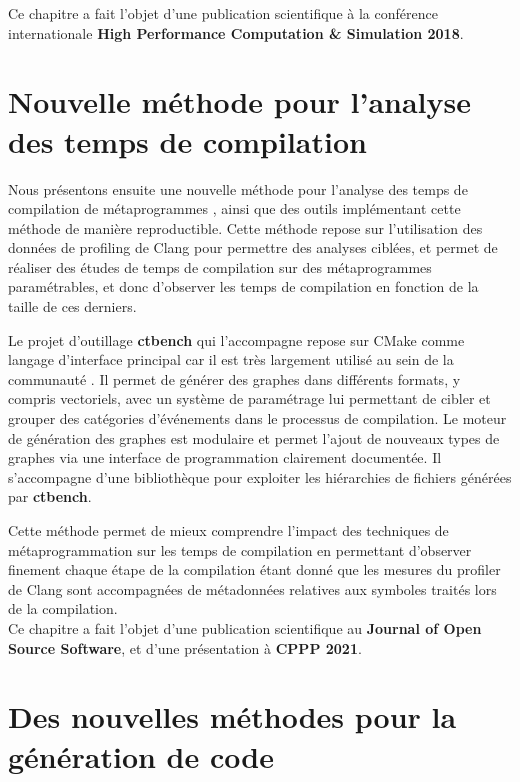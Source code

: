 \documentclass[main]{subfiles}
\begin{document}
Ce chapitre a fait l'objet d'une publication scientifique \`a la conf\'erence
internationale \textbf{High Performance Computation \& Simulation 2018}.

\section{
  Nouvelle m\'ethode pour l'analyse des temps de compilation
}

Nous pr\'esentons ensuite une nouvelle m\'ethode pour l'analyse des temps
de compilation de m\'etaprogrammes \cpp, ainsi que des outils impl\'ementant
cette m\'ethode de mani\`ere reproductible. Cette m\'ethode
repose sur l'utilisation des donn\'ees de profiling de Clang pour permettre
des analyses cibl\'ees, et permet de r\'ealiser des \'etudes de temps
de compilation sur des m\'etaprogrammes param\'etrables, et donc d'observer
les temps de compilation en fonction de la taille de ces derniers.

Le projet d'outillage \textbf{ctbench} qui l'accompagne repose sur CMake
comme langage d'interface principal car il est tr\`es largement utilis\'e
au sein de la communaut\'e \cpp. Il permet de g\'en\'erer des graphes dans
diff\'erents formats, y compris vectoriels, avec un syst\`eme de param\'etrage
lui permettant de cibler et grouper des cat\'egories d'\'ev\'enements
dans le processus de compilation.
Le moteur de g\'en\'eration des graphes est modulaire
et permet l'ajout de nouveaux types de graphes via une interface
de programmation clairement document\'ee. Il s'accompagne d'une biblioth\`eque
\cpp pour exploiter les hi\'erarchies de fichiers g\'en\'er\'ees
par \textbf{ctbench}.

Cette m\'ethode permet de mieux comprendre l'impact des
techniques de m\'etaprogrammation sur les temps de compilation en permettant
d'observer finement chaque \'etape de la compilation \'etant donn\'e que les
mesures du profiler de Clang sont accompagn\'ees de m\'etadonn\'ees relatives
aux symboles \cpp trait\'es lors de la compilation.
\\

Ce chapitre a fait l'objet d'une publication scientifique au
\textbf{Journal of Open Source Software}, et d'une pr\'esentation
\`a \textbf{CPPP 2021}.

\section{
  Des nouvelles m\'ethodes pour la g\'en\'eration de code
}
\end{document}
